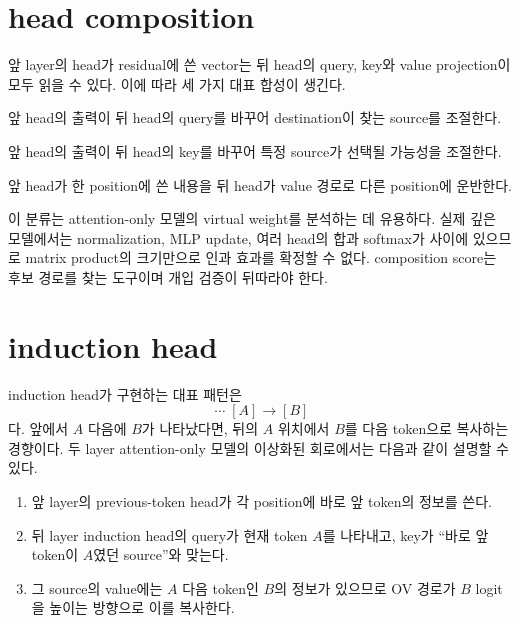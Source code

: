 \section{head composition}

앞 layer의 head가 residual에 쓴 vector는 뒤 head의 query, key와 value projection이 모두 읽을 수 있다.
이에 따라 세 가지 대표 합성이 생긴다.

\begin{description}[style=nextline,leftmargin=2em]
  \item[Q-composition]
  앞 head의 출력이 뒤 head의 query를 바꾸어 destination이 찾는 source를 조절한다.

  \item[K-composition]
  앞 head의 출력이 뒤 head의 key를 바꾸어 특정 source가 선택될 가능성을 조절한다.

  \item[V-composition]
  앞 head가 한 position에 쓴 내용을 뒤 head가 value 경로로 다른 position에 운반한다.
\end{description}

이 분류는 attention-only 모델의 virtual weight를 분석하는 데 유용하다.
실제 깊은 모델에서는 normalization, MLP update, 여러 head의 합과 softmax가 사이에 있으므로 matrix product의 크기만으로 인과 효과를 확정할 수 없다.
composition score는 후보 경로를 찾는 도구이며 개입 검증이 뒤따라야 한다.

\section{induction head}

induction head가 구현하는 대표 패턴은
\begin{equation}
  [A][B]\;\cdots\;[A]\longrightarrow[B]
\end{equation}
다.
앞에서 $A$ 다음에 $B$가 나타났다면, 뒤의 $A$ 위치에서 $B$를 다음 token으로 복사하는 경향이다.
두 layer attention-only 모델의 이상화된 회로에서는 다음과 같이 설명할 수 있다.

\begin{enumerate}
  \item 앞 layer의 previous-token head가 각 position에 바로 앞 token의 정보를 쓴다.
  \item 뒤 layer induction head의 query가 현재 token $A$를 나타내고, key가 ``바로 앞 token이 $A$였던 source''와 맞는다.
  \item 그 source의 value에는 $A$ 다음 token인 $B$의 정보가 있으므로 OV 경로가 $B$ logit을 높이는 방향으로 이를 복사한다.
\end{enumerate}

